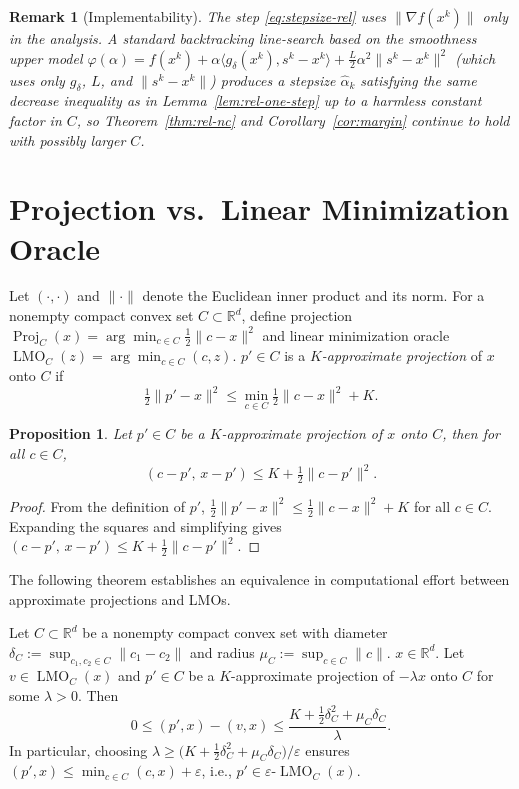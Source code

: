 \documentclass[smallextended]{svjour3}
\newtheorem{prop}[theorem]{Proposition}
\newtheorem{rem}[theorem]{Remark}
\newcommand{\RR}{\mathbb{R}}
\newcommand{\lmo}{\operatorname{LMO}}
\newcommand{\proj}{\operatorname{Proj}}
\begin{document}
\begin{rem}[Implementability]
The step \eqref{eq:stepsize-rel} uses $\|\nabla f(x^k)\|$ only in the analysis. A standard backtracking line-search based on the smoothness upper model 
\(
\varphi(\alpha)=f(x^k)+\alpha\langle g_\delta(x^k),s^k-x^k\rangle+\tfrac{L}{2}\alpha^2\|s^k-x^k\|^2
\)
(which uses only $g_\delta$, $L$, and $\|s^k-x^k\|$) produces a stepsize $\hat\alpha_k$ satisfying the same decrease inequality as in Lemma~\ref{lem:rel-one-step} up to a harmless constant factor in $C$, so Theorem~\ref{thm:rel-nc} and Corollary~\ref{cor:margin} continue to hold with possibly larger $C$.
\end{rem}


\section{Projection vs.\ Linear Minimization Oracle}\label{sec:lmo-vs-proj}

Let $(\cdot,\cdot)$ and $\|\cdot\|$ denote the Euclidean inner product and its norm.
For a nonempty compact convex set $C\subset\RR^d$, define projection $\proj_C(x)=\arg\min_{c\in C}\frac12\|c-x\|^2$ and linear minimization oracle $\lmo_C(z)=\arg\min_{c\in C}(c,z)$. $p'\in C$ is a \emph{$K$-approximate projection} of $x$ onto $C$ if
\[
\tfrac12\|p'-x\|^2\le \min_{c\in C}\tfrac12\|c-x\|^2+K .
\]

\begin{prop}\label{prop:epsproj-bound}
Let $p'\in C$ be a $K$-approximate projection of $x$ onto $C$, then for all $c\in C$,
\[
(c-p',\,x-p')\le K+\tfrac12\|c-p'\|^2 .
\]
\end{prop}
\begin{proof}
From the definition of $p'$,
$\tfrac12\|p'-x\|^2\le \tfrac12\|c-x\|^2+K$ for all $c\in C$.
Expanding the squares and simplifying gives $(c-p',\,x-p')\le K+\tfrac12\|c-p'\|^2$.
\end{proof}

The following theorem establishes an equivalence in computational effort between approximate projections and LMOs.

\begin{theorem}\label{thm:kproj-to-lmo}
Let $C\subset\RR^d$ be a nonempty compact convex set with diameter $\delta_C:=\sup_{c_1,c_2\in C}\|c_1-c_2\|$ and radius $\mu_C:=\sup_{c\in C}\|c\|$. $x\in\RR^d$. Let $v\in\lmo_C(x)$ and $p'\in C$ be a $K$-approximate projection of $-\lambda x$ onto $C$ for some $\lambda>0$. Then
\[
0\le (p',x)-(v,x)\le \frac{K+\frac12\delta_C^2+\mu_C\delta_C}{\lambda}.
\]
In particular, choosing $\lambda\ge\big(K+\frac12\delta_C^2+\mu_C\delta_C\big)/\varepsilon$ ensures
$(p',x)\le \min_{c\in C}(c,x)+\varepsilon$, i.e., $p'\in \varepsilon$-$\lmo_C(x)$.
\end{theorem}
\end{document}
